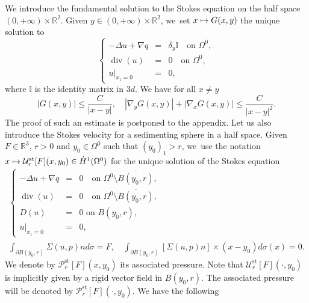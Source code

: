\documentclass[JEP,XML,SOM,Unicode,NoEqCountersInSection,published]{cedram}
\newcommand\mto{\mathchoice{\longmapsto}{\mapsto}{\mapsto}{\mapsto}}
\newcommand{\st}{\mathrm{st}}
\renewcommand{\div}{\operatorname{div}}
\theoremstyle{plain}
\theoremstyle{definition}
\newcommand{\R}{\mathbb{R}}
\begin{document}
We introduce the fundamental solution to the Stokes equation on the half space $(0,+\infty)\times \R^2$. Given $y \in (0,+\infty)\times \R^2$, we~set $x \mto G(x,y)$ the unique solution to
\begin{equation}
\left\{
\begin{array}{rcl}
-\Delta u+\nabla q &=& \delta_{y} \mathbb{I} \quad\text{on } \Omega^0, \\
\div(u)&=&0 \quad\text{on } \Omega^0, \\
u\vert_{x_1=0}&=&0,
\end{array}
\right.
\end{equation}
where $\mathbb{I}$ is the identity matrix in $3d$. We have for all $x \neq y$
\begin{equation}\label{ineq:fundamental_solution}
|G(x,y)| \leq \frac{C}{|x-y|}, \quad |\nabla_y G(x,y)|+ |\nabla_x G(x,y)| \leq \frac{C}{|x-y|^2}.
\end{equation}
The proof of such an estimate is postponed to the appendix.
Let us also introduce the Stokes velocity for a sedimenting sphere in a half space. Given $F\in \R^3$, $r>0$ and $y_0 \in \Omega^0$ such that $(y_0)_1>r$, we~use the notation $x \mto \mathcal{U}^{\st}_{r}[F](x,y_0)\in \dot{H}^1(\Omega^0)$ for the unique solution of the Stokes equation
\begin{gather} \label{eq_stokeslet}
\left\{
\begin{array}{rcl}
-\Delta u+\nabla q &=& 0\quad\text{on } \Omega^0 \setminus \overline{B(y_0,r)},\\
\div(u)&=&0 \quad\text{on }\Omega^0 \setminus \overline{B(y_0,r)},\\
D(u) &=&0 \text { on } B(y_0,r),\\
u\vert_{x_1=0}&=&0,
\end{array}
\right.
\\
\label{eq_stokeslet: force_torque}
\int_{\partial B(y_0,r)} \Sigma(u,p) n d \sigma =F,\quad
\int_{\partial B(y_0,r)} [\Sigma(u,p) n] \times(x-y_0)d \sigma(x)=0.
\end{gather}
We denote by $\mathcal{P}^{\st}_{r}[F](x,y_0) $ its associated pressure. Note that $\mathcal{U}^{\st}_{r}[F](\cdot,y_0)$ is implicitly given by a rigid vector field in $B(y_0,r)$. The associated pressure will be denoted by $\mathcal{P}^{\st}_{r}[F](\cdot,y_0)$. We have the following
\end{document}
